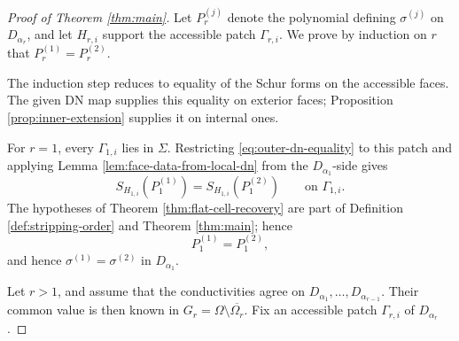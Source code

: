\documentclass[10pt,a4paper]{amsart}
\begin{document}
\begin{proof}[Proof of Theorem \ref{thm:main}]
Let \(P_r^{(j)}\) denote the polynomial defining \(\sigma^{(j)}\) on
\(D_{\alpha_r}\), and let \(H_{r,i}\) support the accessible patch
\(\Gamma_{r,i}\).  We prove by induction on \(r\) that
\(P_r^{(1)}=P_r^{(2)}\).

The induction step reduces to equality of the Schur forms on the accessible
faces.  The given DN map supplies this equality on exterior faces; Proposition
\ref{prop:inner-extension} supplies it on internal ones.

For \(r=1\), every \(\Gamma_{1,i}\) lies in \(\Sigma\).  Restricting
\eqref{eq:outer-dn-equality} to this patch and applying Lemma
\ref{lem:face-data-from-local-dn} from the \(D_{\alpha_1}\)-side gives
\begin{equation}
  S_{H_{1,i}}(P_1^{(1)})
  =
  S_{H_{1,i}}(P_1^{(2)})
  \qquad\text{on }\Gamma_{1,i}.
  \label{eq:first-step-face-data}
\end{equation}
The hypotheses of Theorem \ref{thm:flat-cell-recovery} are part of Definition
\ref{def:stripping-order} and Theorem \ref{thm:main}; hence
\begin{equation}
  P_1^{(1)}=P_1^{(2)},
\end{equation}
and hence \(\sigma^{(1)}=\sigma^{(2)}\) in \(D_{\alpha_1}\).

Let \(r>1\), and assume that the conductivities agree on
\(D_{\alpha_1},\ldots,D_{\alpha_{r-1}}\).  Their common value is then known in
\(G_r=\Omega\setminus\overline{\Omega_r}\).  Fix an accessible patch
\(\Gamma_{r,i}\) of \(D_{\alpha_r}\).


\end{proof}
\end{document}
